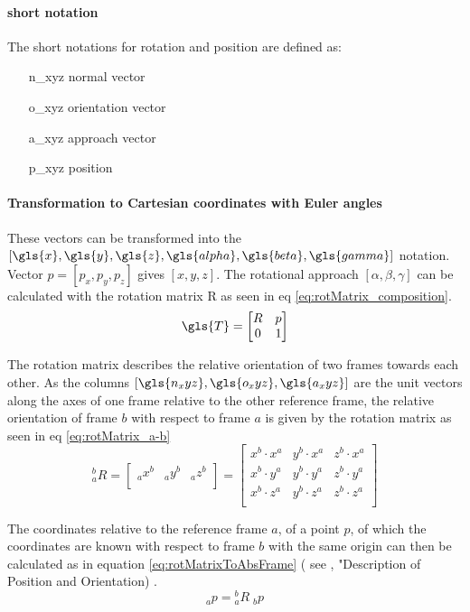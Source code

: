 \paragraph{short notation}
The short notations for rotation and position are defined as:

\begin{itemize}
	\item[\gls{n_xyz}] normal vector
	\item[\gls{o_xyz}] orientation vector
	\item[\gls{a_xyz}] approach vector
	\item[\gls{p_xyz}] position
\end{itemize}


\paragraph{Transformation to Cartesian coordinates with Euler angles }
These vectors can be transformed into the $[\gls{x},\gls{y},\gls{z},\gls{alpha},\gls{beta},\gls{gamma}]$ notation.
Vector $p = [p_x, p_y, p_z] $ gives $[x,y,z]$.
The rotational approach $[\alpha, \beta, \gamma]$ can be calculated with the rotation matrix \gls{R} as seen in eq \ref{eq:rotMatrix_composition}.
\begin{equation}\label{eq:rotMatrix_composition}
\gls{T} = 
\begin{bmatrix}
R & p \\
0 & 1 \\
\end{bmatrix}
\end{equation}

The rotation matrix describes the relative orientation of two frames towards each other. As the columns $[\gls{n_xyz},\gls{o_xyz},\gls{a_xyz}]$ are the unit vectors along the axes of one frame relative to the other reference frame, the relative orientation of frame ${b}$ with respect to frame ${a}$ is given by the rotation matrix as seen in eq \ref{eq:rotMatrix_a-b} \cite{ConstantinForwardKA}
\begin{equation}\label{eq:rotMatrix_a-b}
\phantom{}^b_aR =
\begin{bmatrix}
\phantom{}_ax^b & \phantom{}_ay^b & \phantom{}_az^b \\
\end{bmatrix}
=
\begin{bmatrix}
x^b \cdot x^a & y^b \cdot x^a & z^b \cdot x^a \\
x^b \cdot y^a & y^b \cdot y^a & z^b \cdot y^a \\
x^b \cdot z^a & y^b \cdot z^a & z^b \cdot z^a \\
\end{bmatrix}
\end{equation}

The coordinates relative to the reference frame ${a}$, of a point $p$, of which the coordinates are known with respect to frame ${b}$ with the same origin can then be calculated as in equation \ref{eq:rotMatrixToAbsFrame}  ( see \cite{RobotKinemDyn}, "Description of Position and Orientation) .
\begin{equation}\label{eq:rotMatrixToAbsFrame}
\phantom{}_a p = \phantom{}^b_aR\phantom{.}_b p 
\end{equation}


